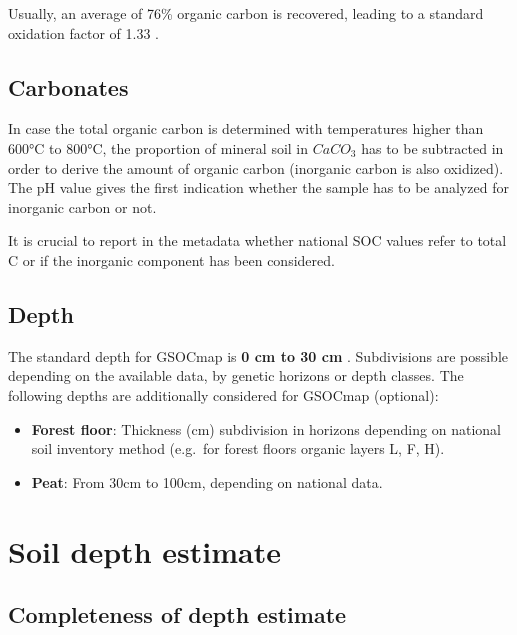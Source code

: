 \documentclass[10pt,b5paper,]{book}
\theoremstyle{definition}
\theoremstyle{definition}
\theoremstyle{definition}
\theoremstyle{remark}
\begin{document}
Usually, an average of 76\% organic carbon is recovered, leading to a
standard oxidation factor of 1.33 \citep{lettens2005soil}.

\hypertarget{carbonates}{%
\subsection{Carbonates}\label{carbonates}}

In case the total organic carbon is determined with temperatures higher
than 600°C to 800°C, the proportion of mineral soil in \(CaCO_3\) has to
be subtracted in order to derive the amount of organic carbon (inorganic
carbon is also oxidized). The pH value gives the first indication
whether the sample has to be analyzed for inorganic carbon or not.

It is crucial to report in the metadata whether national SOC values
refer to total C or if the inorganic component has been considered.

\hypertarget{depth}{%
\subsection{Depth}\label{depth}}

The standard depth for GSOCmap is \textbf{0 cm to 30 cm}
\citep{gsp_guidelines_2017}. Subdivisions are possible depending on the
available data, by genetic horizons or depth classes. The following
depths are additionally considered for GSOCmap (optional):

\begin{itemize}
\item
  \textbf{Forest floor}: Thickness (cm) subdivision in horizons
  depending on national soil inventory method (e.g.~for forest floors
  organic layers L, F, H).
\item
  \textbf{Peat}: From 30cm to 100cm, depending on national data.
\end{itemize}

\hypertarget{soil-depth-estimate}{%
\section{Soil depth estimate}\label{soil-depth-estimate}}

\hypertarget{completeness-of-depth-estimate}{%
\subsection{Completeness of depth
estimate}\label{completeness-of-depth-estimate}}
\end{document}
